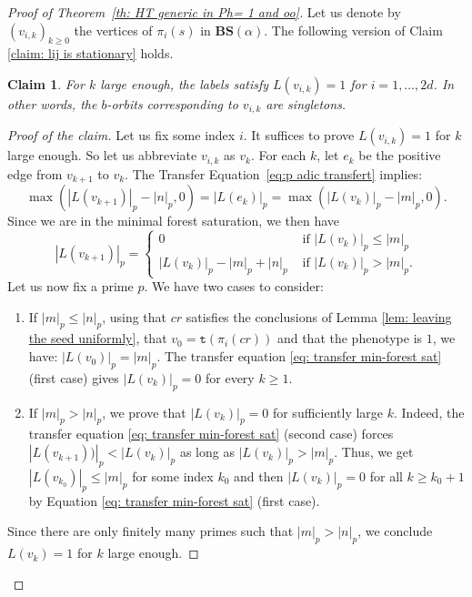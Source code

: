 \documentclass[12pt]{article}
\numberwithin{equation}{section}
\newtheorem{claim}[equation]{Claim}
\theoremstyle{definition}
\newenvironment{cproof}{\begin{proof}[Proof of the
        claim]\renewcommand*{\qedsymbol}{\(\square_\text{claim}\)}}{\end{proof}}
\newcommand{\abs}[1]{\left\lvert #1\right\rvert}
\newcommand\BSe{\mathbf{BS}}
\newcommand{\target}{\mathtt{t}}
\begin{document}
\begin{proof}[Proof of Theorem~\ref{th: HT generic in Ph= 1 and oo}]
    
    Let us denote by $(v_{i,k})_{k\geq 0}$ the vertices of $\pi_i(s)$ in \( \BSe(\alpha) \).
    The following version of Claim \ref{claim: lij is stationary} holds.
    \begin{claim}\label{claim: arriving at labels 1}
        For $k$ large enough, the labels satisfy $L(v_{i,k}) = 1$ for $ i=1,\ldots, 2d$. In other words, the \( b \)-orbits corresponding to $v_{i,k}$ are singletons.
    \end{claim}
    \begin{cproof}
        Let us fix some index $i$. 
        It suffices to prove $L(v_{i,k}) = 1$ for $k$ large enough.
        So let us abbreviate $v_{i,k}$ as $v_k$.
        For each $k$, let $e_k$ be the positive edge from $v_{k+1}$ to $v_k$.
        The Transfer Equation~\eqref{eq:p adic transfert} implies:
        \[
	\max(\abs{L(v_{k+1})}_p - \abs{n}_p,0)
	= \abs{L(e_k)}_p
	= \max(\abs{L(v_k)}_p - \abs{m}_p, 0).
\]
    Since we are in the minimal forest saturation, we then have
    \begin{equation}\label{eq: transfer min-forest sat}
        \abs{L(v_{k+1})}_p = \begin{cases}
            0 & \text{ if } \abs{L(v_k)}_p \leq \abs{m}_p \\
            \abs{L(v_k)}_p - \abs{m}_p + \abs{n}_p & \text{ if } \abs{L(v_k)}_p > \abs{m}_p .
        \end{cases}
    \end{equation}
    Let us now fix a prime $p$. We have two cases to consider:
    \begin{enumerate}
        \item  If $\abs{m}_p \leq \abs{n}_p$, 
        using that $cr$ satisfies the conclusions of Lemma \ref{lem: leaving the seed uniformly}, 
        that $v_0 = \target(\pi_i(cr))$ and that the phenotype is $1$, we have: $\abs{L(v_0)}_p = \abs{m}_p$.
        The transfer equation 
        \eqref{eq: transfer min-forest sat} (first case) gives $\abs{L(v_k)}_p = 0$ for every $k\geq 1$.
        
        \item If $\abs{m}_p >\abs{n}_p$,
        we prove that $\abs{L(v_k)}_p = 0$ for sufficiently large $k$.
        Indeed, the transfer equation \eqref{eq: transfer min-forest sat} (second case) forces $\abs{L(v_{k + 1}))}_p < \abs{L(v_k)}_p$  as long as 
        $\abs{L(v_k)}_p > \abs{m}_p$. 
        Thus, we get $\abs{L(v_{k_0})}_p \leq \abs{m}_p$ for some index $k_0$
        and then $\abs{L(v_k)}_p=0$  for all $k \geq k_0 + 1$ by Equation \eqref{eq: transfer min-forest sat} (first case).
    \end{enumerate}
    Since there are only finitely many primes such that $\abs{m}_p >\abs{n}_p$, we conclude $L(v_k) = 1$ for $k$ large enough.
    \end{cproof}
    

\end{proof}
\end{document}
